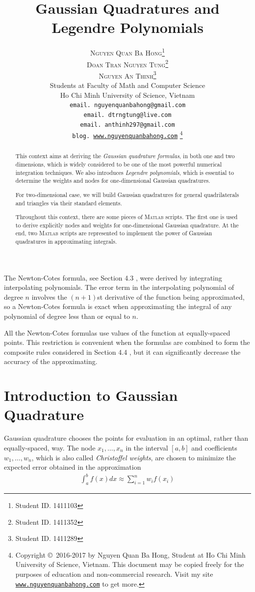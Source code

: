 \documentclass[a4paper]{article}
\title{\Huge Gaussian Quadratures and Legendre Polynomials}
\author{\textsc{Nguyen Quan Ba Hong}\footnote{Student ID. 1411103}\\
\textsc{Doan Tran Nguyen Tung}\footnote{Student ID. 1411352}\\
\textsc{Nguyen An Thinh}\footnote{Student ID. 1411289}\\
{\small Students at Faculty of Math and Computer Science}\\ 
{\small Ho Chi Minh University of Science, Vietnam} \\
{\small \texttt{email. nguyenquanbahong@gmail.com}}\\
{\small \texttt{email. dtrngtung@live.com}}\\
{\small \texttt{email. anthinh297@gmail.com}}\\
{\small \texttt{blog. \url{www.nguyenquanbahong.com}} 
\footnote{Copyright \copyright\ 2016-2017 by Nguyen Quan Ba Hong, Student at Ho Chi Minh University of Science, Vietnam. This document may be copied freely for the purposes of education and non-commercial research. Visit my site \texttt{\url{www.nguyenquanbahong.com}} to get more.}}}
\numberwithin{equation}{section}
\begin{document}
\maketitle
\begin{abstract}
This context aims at deriving the \textit{Gaussian quadrature formulas}, in both one and two dimensions, which is widely considered to be one of the most powerful numerical integration techniques. We also introduces \textit{Legendre polynomials}, which is essential to determine the weights and nodes for one-dimensional Gaussian quadratures.

For two-dimensional case, we will build Gaussian quadratures for general quadrilaterals and triangles via their standard elements.

Throughout this context, there are some pieces of \textsc{Matlab} scripts. The first one is used to derive explicitly nodes and weights for one-dimensional Gaussian quadrature. At the end, two \textsc{Matlab} scripts are represented to implement the power of Gaussian quadratures in approximating integrals.
\end{abstract}
\newpage
\tableofcontents
\newpage
\listoffigures
\newpage
\listoftables
\newpage
The Newton-Cotes formula, see Section 4.3 \cite{1}, were derived by integrating interpolating polynomials. The error term in the interpolating polynomial of degree $n$ involves the $\left(n+1\right)$st derivative of the function being approximated, so a Newton-Cotes formula is exact when approximating the integral of any polynomial of degree less than or equal to $n$.

All the Newton-Cotes formulas use values of the function at equally-spaced points. This restriction is convenient when the formulas are combined to form the composite rules considered in Section 4.4 \cite{1}, but it can significantly decrease the accuracy of the approximating.
\section{Introduction to Gaussian Quadrature}
Gaussian quadrature chooses the points for evaluation in an optimal, rather than equally-spaced, way. The node $x_1,\ldots,x_n$ in the interval $\left[a,b\right]$ and coefficients $w_1,\ldots,w_n$, which is also called \textit{Christoffel weights}, are chosen to minimize the expected error obtained in the approximation
\begin{align}
\label{1.1}
\int_a^b {f\left( x \right)dx}  \approx \sum\limits_{i = 1}^n {{w_i}f\left( {{x_i}} \right)} 
\end{align}
\end{document}
